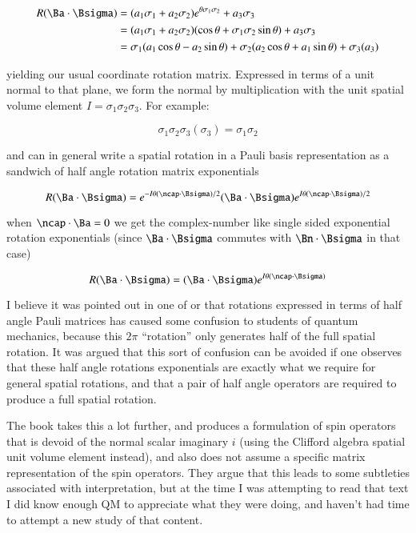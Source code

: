 \begin{align*}
R( \Ba \cdot \Bsigma) 
&= 
(a_1 \sigma_1 + a_2 \sigma_2) e^{\theta \sigma_1 \sigma_2} +  
a_3 \sigma_3 \\
&= 
(a_1 \sigma_1 + a_2 \sigma_2) (\cos\theta + \sigma_1 \sigma_2 \sin\theta)
+a_3 \sigma_3 \\
&= 
\sigma_1 (a_1 \cos\theta - a_2 \sin\theta)
+ \sigma_2 (a_2 \cos\theta + a_1 \sin\theta)
+ \sigma_3 (a_3)
\end{align*}

yielding our usual coordinate rotation matrix.  Expressed in terms of a unit normal to that plane, we form the normal by multiplication with the unit spatial volume element $I = \sigma_1 \sigma_2 \sigma_3$.  For example:

\begin{equation}\label{eqn:qmTwoL15:5060}
\sigma_1 \sigma_2 \sigma_3( \sigma_3 )
=
\sigma_1 \sigma_2 
\end{equation}

and can in general write a spatial rotation in a Pauli basis representation as a sandwich of half angle rotation matrix exponentials 

\begin{equation}\label{eqn:qmTwoL15:5080}
R( \Ba \cdot \Bsigma) 
= 
e^{-I \theta (\ncap \cdot \Bsigma)/2} 
(\Ba \cdot \Bsigma)
e^{I \theta (\ncap \cdot \Bsigma)/2} 
\end{equation}

when $\ncap \cdot \Ba = 0$ we get the complex-number like single sided exponential rotation exponentials (since $\Ba \cdot \Bsigma$ commutes with $\Bn \cdot \Bsigma$ in that case)

\begin{equation}\label{eqn:qmTwoL15:5100}
R( \Ba \cdot \Bsigma) 
= 
(\Ba \cdot \Bsigma )
e^{I \theta (\ncap \cdot \Bsigma)} 
\end{equation}

I believe it was pointed out in one of \cite{doran2003gap} or \cite{hestenes1999nfc} that rotations expressed in terms of half angle Pauli matrices has caused some confusion to students of quantum mechanics, because this $2 \pi$ ``rotation'' only generates half of the full spatial rotation.  It was argued that this sort of confusion can be avoided if one observes that these half angle rotations exponentials are exactly what we require for general spatial rotations, and that a pair of half angle operators are required to produce a full spatial rotation.  

The book \cite{doran2003gap} takes this a lot further, and produces a formulation of spin operators that is devoid of the normal scalar imaginary $i$ (using the Clifford algebra spatial unit volume element instead), and also does not assume a specific matrix representation of the spin operators.  They argue that this leads to some subtleties associated with interpretation, but at the time I was attempting to read that text I did know enough QM to appreciate what they were doing, and haven't had time to attempt a new study of that content.

